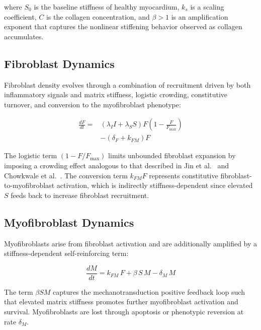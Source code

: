 \documentclass[Afour,sageh,times]{sagej}
\begin{document}
where $S_0$ is the baseline stiffness of healthy myocardium, $k_s$ is a scaling coefficient, $C$ is the collagen concentration, and $\beta > 1$ is an amplification exponent that captures the nonlinear stiffening behavior observed as collagen accumulates. 

\subsection{Fibroblast Dynamics}

Fibroblast density evolves through a combination of recruitment driven by both inflammatory signals and matrix stiffness, logistic crowding, constitutive turnover, and conversion to the myofibroblast phenotype:

\begin{equation}
\begin{aligned}
\frac{dF}{dt} = &
\left(\lambda_I I + \lambda_S S\right) F 
\left(1 - \frac{F}{F_\mathrm{max}}\right) \\
&- (\delta_F + k_{FM})F
\end{aligned}
\end{equation}

The logistic term $(1 - F/F_\mathrm{max})$ limits unbounded fibroblast expansion by imposing a crowding effect analogous to that described in Jin et al.~\citep{jin2011combining} and Chowkwale et al.~\citep{chowkwale2023}. The conversion term $k_{FM} F$ represents constitutive fibroblast-to-myofibroblast activation, which is indirectly stiffness-dependent since elevated $S$ feeds back to increase fibroblast recruitment.

\subsection{Myofibroblast Dynamics}

Myofibroblasts arise from fibroblast activation and are additionally amplified by a stiffness-dependent self-reinforcing term:

\begin{equation}\label{eq:myofibroblasts}
\frac{dM}{dt} = k_{FM}\, F + \beta\, S\, M - \delta_M\, M
\end{equation}

The term $\beta S M$ captures the mechanotransduction positive feedback loop such that elevated matrix stiffness promotes further myofibroblast activation and survival. Myofibroblasts are lost through apoptosis or phenotypic reversion at rate $\delta_M$.
\end{document}
